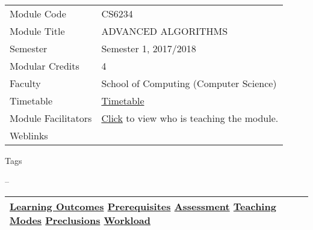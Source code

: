 \hypertarget{ctl00_ctl00_ContentPlaceHolder1_ContentPlaceHolder1_LV_itemPlaceholderContainer}{}
\begin{longtable}[]{@{}ll@{}}
\toprule
\protect\hypertarget{ctl00_ctl00_ContentPlaceHolder1_ContentPlaceHolder1_LV_ctrl0_txtCode}{}{Module
Code} &
\protect\hypertarget{ctl00_ctl00_ContentPlaceHolder1_ContentPlaceHolder1_LV_ctrl0_lcCode}{}{CS6234}\tabularnewline
\protect\hypertarget{ctl00_ctl00_ContentPlaceHolder1_ContentPlaceHolder1_LV_ctrl0_lcCourse}{}{Module
Title} &
\protect\hypertarget{ctl00_ctl00_ContentPlaceHolder1_ContentPlaceHolder1_LV_ctrl0_lcCourseName}{}{ADVANCED
ALGORITHMS}\tabularnewline
\protect\hypertarget{ctl00_ctl00_ContentPlaceHolder1_ContentPlaceHolder1_LV_ctrl0_lcSemester}{}{Semester}
&
\protect\hypertarget{ctl00_ctl00_ContentPlaceHolder1_ContentPlaceHolder1_LV_ctrl0_lcSem}{}{Semester
1, 2017/2018}\tabularnewline
\protect\hypertarget{ctl00_ctl00_ContentPlaceHolder1_ContentPlaceHolder1_LV_ctrl0_lcModCredit}{}{Modular
Credits} &
\protect\hypertarget{ctl00_ctl00_ContentPlaceHolder1_ContentPlaceHolder1_LV_ctrl0_lcModC}{}{4}\tabularnewline
\protect\hypertarget{ctl00_ctl00_ContentPlaceHolder1_ContentPlaceHolder1_LV_ctrl0_lcFaculty}{}{Faculty}
&
\protect\hypertarget{ctl00_ctl00_ContentPlaceHolder1_ContentPlaceHolder1_LV_ctrl0_lcFac}{}{School
of Computing (Computer Science)}\tabularnewline
\protect\hypertarget{ctl00_ctl00_ContentPlaceHolder1_ContentPlaceHolder1_LV_ctrl0_Label1}{}{Timetable}
&
\protect\hypertarget{ctl00_ctl00_ContentPlaceHolder1_ContentPlaceHolder1_LV_ctrl0_Span1}{}{\href{javascript:void(0);}{Timetable}}\tabularnewline
\protect\hypertarget{ctl00_ctl00_ContentPlaceHolder1_ContentPlaceHolder1_LV_ctrl0_Label6}{}{Module
Facilitators} &
\protect\hypertarget{ctl00_ctl00_ContentPlaceHolder1_ContentPlaceHolder1_LV_ctrl0_Span2}{}{\href{list_lecturers.aspx?CourseID=73236e5b-0811-453f-aa6f-892e4c757158\&ClickFrom=}{Click}
to view who is teaching the module.}\tabularnewline
\protect\hypertarget{ctl00_ctl00_ContentPlaceHolder1_ContentPlaceHolder1_LV_ctrl0_LabelCtrl1}{}{Weblinks}
&\tabularnewline
\bottomrule
\end{longtable}

\protect\hypertarget{ctl00_ctl00_ContentPlaceHolder1_ContentPlaceHolder1_LV_ctrl0_Label4}{}{Tags}

\protect\hypertarget{ctl00_ctl00_ContentPlaceHolder1_ContentPlaceHolder1_LV_ctrl0_lblTags}{}{--}

\begin{longtable}[]{@{}l@{}}
\toprule
\protect\hypertarget{ctl00_ctl00_ContentPlaceHolder1_ContentPlaceHolder1_lblSectionMiddle}{}{\protect\hyperlink{Learningux5cux2520Outcomes}{Learning
Outcomes} \textbar{} \protect\hyperlink{Prerequisites}{Prerequisites}
\textbar{} \protect\hyperlink{Assessment}{Assessment} \textbar{}
\protect\hyperlink{Teachingux5cux2520Modes}{Teaching Modes} \textbar{}
\protect\hyperlink{Preclusions}{Preclusions} \textbar{}
\protect\hyperlink{Workload}{Workload}}\tabularnewline
\bottomrule
\end{longtable}

